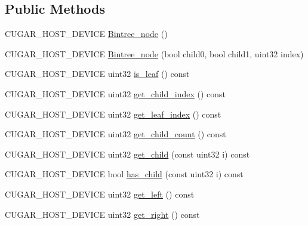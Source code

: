 \subsection*{Public Methods}
\begin{DoxyCompactItemize}
\item 
C\+U\+G\+A\+R\+\_\+\+H\+O\+S\+T\+\_\+\+D\+E\+V\+I\+CE \hyperlink{structcugar_1_1_bintree__node_3_01leaf__index__tag_01_4_a657e48abcb145d518e9bfd692fa66d96}{Bintree\+\_\+node} ()
\item 
C\+U\+G\+A\+R\+\_\+\+H\+O\+S\+T\+\_\+\+D\+E\+V\+I\+CE \hyperlink{structcugar_1_1_bintree__node_3_01leaf__index__tag_01_4_a2524c1c7d0a050dc29fe3b44056f535c}{Bintree\+\_\+node} (bool child0, bool child1, uint32 index)
\item 
C\+U\+G\+A\+R\+\_\+\+H\+O\+S\+T\+\_\+\+D\+E\+V\+I\+CE uint32 \hyperlink{structcugar_1_1_bintree__node_3_01leaf__index__tag_01_4_a71208aedba4f65bc0c2002926ab78d85}{is\+\_\+leaf} () const
\item 
C\+U\+G\+A\+R\+\_\+\+H\+O\+S\+T\+\_\+\+D\+E\+V\+I\+CE uint32 \hyperlink{structcugar_1_1_bintree__node_3_01leaf__index__tag_01_4_a8b6d15fa4a8e97895fbc838f01612f2d}{get\+\_\+child\+\_\+index} () const
\item 
C\+U\+G\+A\+R\+\_\+\+H\+O\+S\+T\+\_\+\+D\+E\+V\+I\+CE uint32 \hyperlink{structcugar_1_1_bintree__node_3_01leaf__index__tag_01_4_a0da94a6b8fe862f4701d45a00c8b08c8}{get\+\_\+leaf\+\_\+index} () const
\item 
C\+U\+G\+A\+R\+\_\+\+H\+O\+S\+T\+\_\+\+D\+E\+V\+I\+CE uint32 \hyperlink{structcugar_1_1_bintree__node_3_01leaf__index__tag_01_4_a4d169a35a72c9c85124592210b2b9412}{get\+\_\+child\+\_\+count} () const
\item 
C\+U\+G\+A\+R\+\_\+\+H\+O\+S\+T\+\_\+\+D\+E\+V\+I\+CE uint32 \hyperlink{structcugar_1_1_bintree__node_3_01leaf__index__tag_01_4_a5a5689764ebf4ddedb849e527b81c279}{get\+\_\+child} (const uint32 i) const
\item 
C\+U\+G\+A\+R\+\_\+\+H\+O\+S\+T\+\_\+\+D\+E\+V\+I\+CE bool \hyperlink{structcugar_1_1_bintree__node_3_01leaf__index__tag_01_4_aaf83c1431603af76b9f0ac619e7d4383}{has\+\_\+child} (const uint32 i) const
\item 
C\+U\+G\+A\+R\+\_\+\+H\+O\+S\+T\+\_\+\+D\+E\+V\+I\+CE uint32 \hyperlink{structcugar_1_1_bintree__node_3_01leaf__index__tag_01_4_a7476106b60fc6bb7681d0f032321bab6}{get\+\_\+left} () const
\item 
C\+U\+G\+A\+R\+\_\+\+H\+O\+S\+T\+\_\+\+D\+E\+V\+I\+CE uint32 \hyperlink{structcugar_1_1_bintree__node_3_01leaf__index__tag_01_4_a78388f568c1bc3d1d238f35788d539c8}{get\+\_\+right} () const
\end{DoxyCompactItemize}
